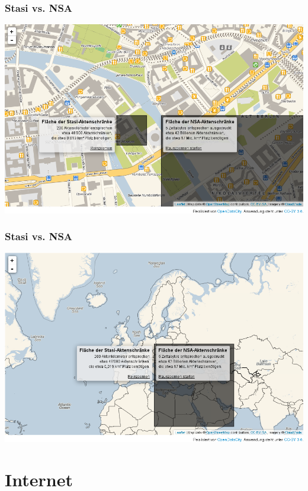 \documentclass[12pt]{beamer}
\begin{document}
\begin{frame}
    \frametitle{Stasi vs. NSA}
    \begin{center}
      \includegraphics[height=0.7\textheight]{img/akten1.png}
    \end{center}
\end{frame}

\begin{frame}
    \frametitle{Stasi vs. NSA}
    \begin{center}
      \includegraphics[height=0.7\textheight]{img/akten2.png}
    \end{center}
\end{frame}

\section{Internet}
\subsection{}
\end{document}
